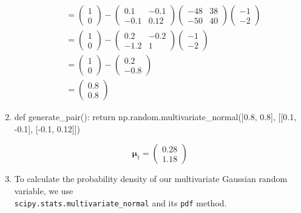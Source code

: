 \documentclass{article}
\begin{document}
\begin{enumerate}
\begin{align*}
&= \begin{pmatrix}1 \\ 0 \end{pmatrix} - 
\begin{pmatrix}
0.1 & -0.1 \\
-0.1 & 0.12
\end{pmatrix}
\begin{pmatrix}
-48 & 38 \\
-50 & 40
\end{pmatrix}
\begin{pmatrix}-1 \\ -2\end{pmatrix} \\
&= \begin{pmatrix}1 \\ 0 \end{pmatrix} - 
\begin{pmatrix}
0.2 & -0.2 \\
-1.2 & 1
\end{pmatrix}
\begin{pmatrix}-1 \\ -2\end{pmatrix} \\
&= \begin{pmatrix}1 \\ 0 \end{pmatrix} - 
\begin{pmatrix}0.2 \\ -0.8 \end{pmatrix} \\
&= \begin{pmatrix}0.8 \\ 0.8 \end{pmatrix}
\end{align*}
\item 
\begin{python}
def generate_pair():
    return np.random.multivariate_normal([0.8, 0.8], 
    					 [[0.1, -0.1],
    	 				  [-0.1, 0.12]])
\end{python}
$$
\bm{\mu}_t=\begin{pmatrix}0.28 \\ 1.18 \end{pmatrix}
$$
\item
To calculate the probability density of our multivariate Gaussian random variable, we use \\ \texttt{scipy.stats.multivariate\_normal} and its \texttt{pdf} method.
\begin{figure}[H]
\centering

\end{figure}
\end{enumerate}
\end{document}
